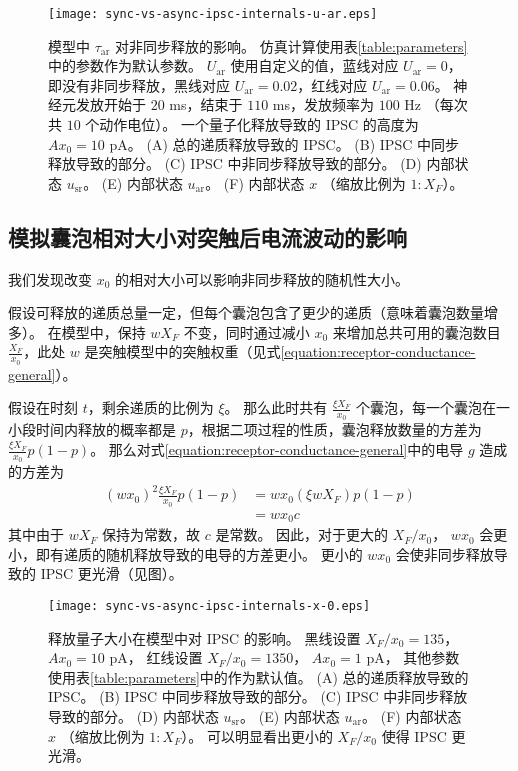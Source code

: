 \begin{figure}
\texttt{[image: sync-vs-async-ipsc-internals-u-ar.eps]}
\caption{模型中 $\tau_\text{ar}$ 对非同步释放的影响。
仿真计算使用表\ref{table:parameters}中的参数作为默认参数。
$U_\text{ar}$ 使用自定义的值，蓝线对应 $U_\text{ar} = 0$，即没有非同步释放，黑线对应 $U_\text{ar} = 0.02$，红线对应 $U_\text{ar} = 0.06$。
神经元发放开始于 $20$ ms，结束于 $110$ ms，发放频率为 $100$ Hz （每次共 $10$ 个动作电位）。
一个量子化释放导致的 IPSC 的高度为 $Ax_0 = 10$ pA。
(A) 总的递质释放导致的 IPSC。
(B) IPSC 中同步释放导致的部分。
(C) IPSC 中非同步释放导致的部分。
(D) 内部状态 $u_\text{sr}$。
(E) 内部状态 $u_\text{ar}$。
(F) 内部状态 $x$ （缩放比例为 $1:X_F$）。}
\label{figure:modulation-of-u-ar}
\end{figure}

\subsection{模拟囊泡相对大小对突触后电流波动的影响}
\label{section:result:modulate-x-0}
我们发现改变 $x_0$ 的相对大小可以影响非同步释放的随机性大小。

假设可释放的递质总量一定，但每个囊泡包含了更少的递质（意味着囊泡数量增多）。
在模型中，保持 $wX_F$ 不变，同时通过减小 $x_0$ 来增加总共可用的囊泡数目 $\frac{X_F}{x_0}$，此处 $w$ 是突触模型中的突触权重（见式\ref{equation:receptor-conductance-general}）。

假设在时刻 $t$，剩余递质的比例为 $\xi$。
那么此时共有 $\frac{\xi X_F}{x_0}$ 个囊泡，每一个囊泡在一小段时间内释放的概率都是 $p$，根据二项过程的性质，囊泡释放数量的方差为 $\frac{\xi X_F}{x_0}p(1-p)$。
那么对式\ref{equation:receptor-conductance-general}中的电导 $g$ 造成的方差为
\begin{equation}
\begin{split}
(wx_0)^2 \frac{\xi X_F}{x_0} p (1-p) &= wx_0 (\xi  w  X_F) p (1-p) \\
&= wx_0  c
\end{split}
\label{equation:quantum-effect}
\end{equation}
其中由于 $wX_F$ 保持为常数，故 $c$ 是常数。
因此，对于更大的 $X_F/x_0$， $wx_0$ 会更小，即有递质的随机释放导致的电导的方差更小。
更小的 $wx_0$ 会使非同步释放导致的 IPSC 更光滑（见图）。

\begin{figure}
\texttt{[image: sync-vs-async-ipsc-internals-x-0.eps]}
\caption{释放量子大小在模型中对 IPSC 的影响。
黑线设置 $X_F / x_0 = 135$， $Ax_0 = 10$ pA，
红线设置 $X_F / x_0 = 1350$， $Ax_0 = 1$ pA，
其他参数使用表\ref{table:parameters}中的作为默认值。
(A) 总的递质释放导致的 IPSC。
(B) IPSC 中同步释放导致的部分。
(C) IPSC 中非同步释放导致的部分。
(D) 内部状态 $u_\text{sr}$。
(E) 内部状态 $u_\text{ar}$。
(F) 内部状态 $x$ （缩放比例为 $1:X_F$）。
可以明显看出更小的 $X_F/x_0$ 使得 IPSC 更光滑。}
\label{figure:changes-with-x-0} 
\end{figure}



